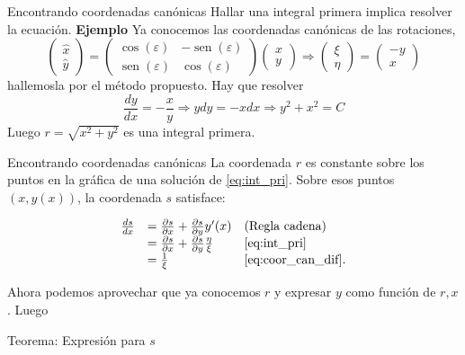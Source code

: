 \documentclass[handout,hyperref={colorlinks=true}]{beamer}
\renewcommand{\epsilon}{\varepsilon}
\DeclareMathOperator{\sen}{sen}
\begin{document}
\begin{frame}{Encontrando coordenadas canónicas}
Hallar una integral primera implica resolver la ecuación.
\textbf{Ejemplo} Ya conocemos las coordenadas canónicas de las rotaciones, 
\[
 \begin{pmatrix} \hat{x}\\ \hat{y}
\end{pmatrix}=\begin{pmatrix} \cos(\epsilon) & -\sen(\epsilon)
\\ \sen(\epsilon) & \cos(\epsilon)
\end{pmatrix} \begin{pmatrix} x\\ y
\end{pmatrix}\Rightarrow  \begin{pmatrix} \xi\\ \eta
\end{pmatrix}= \begin{pmatrix} -y\\ x
\end{pmatrix}
\]
hallemosla por el método propuesto. Hay que resolver 
\[\frac{dy}{dx}=-\frac{x}{y}\Rightarrow ydy=-xdx\Rightarrow y^2+x^2=C\]
Luego $r=\sqrt{x^2+y^2}$ es una integral primera. 


\end{frame}



\begin{frame}{Encontrando coordenadas canónicas}
La coordenada $r$ es constante sobre los puntos en la gráfica de una solución de \eqref{eq:int_pri}. Sobre esos puntos $(x,y(x))$, la coordenada $s$ satisface:

\begin{equation} \label{eq:coor_can_s}
\begin{array}{lll}
\frac{ds}{dx}&=\frac{\partial s}{\partial x}+\frac{\partial s}{\partial y} y'(x) & \hbox{(Regla cadena)}\\
&=\frac{\partial s}{\partial x}+\frac{\partial s}{\partial y} \frac{\eta}{\xi} &
  \eqref{eq:int_pri}\\
&=\frac{1}{\xi} &\hbox{\eqref{eq:coor_can_dif}}.
\end{array}
\end{equation}

Ahora podemos aprovechar que ya conocemos $r$ y  expresar $y$ como función de $r,x$. Luego

\begin{block}{Teorema: Expresión para $s$}
 
\end{block}

 






\end{frame}
\end{document}
